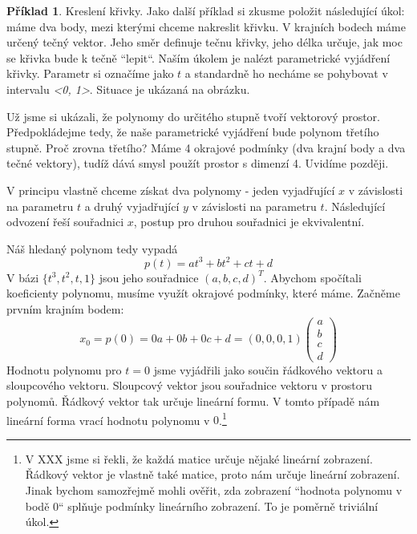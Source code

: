 \documentclass[a5paper,12pt]{amsbook}
\theoremstyle{definition}
\newtheorem{example}{Příklad}[chapter]
\begin{document}
\begin{example}\label{example:linforma2}Kreslení křivky. Jako další příklad si zkusme položit následující
úkol: máme dva body, mezi kterými chceme nakreslit křivku. V krajních bodech máme určený tečný vektor.
Jeho směr definuje tečnu křivky, jeho délka určuje, jak moc se křivka bude k tečně ``lepit``. Naším úkolem
je nalézt parametrické vyjádření křivky. Parametr si označíme jako $t$ a standardně ho necháme se pohybovat
v intervalu \textit{<0, 1>}. Situace je ukázaná na obrázku.

\begin{center}

\end{center}

Už jsme si ukázali, že polynomy do určitého stupně tvoří vektorový prostor. Předpokládejme tedy, že
naše parametrické vyjádření bude polynom třetího stupně. Proč zrovna třetího? Máme 4 okrajové podmínky
(dva krajní body a dva tečné vektory), tudíž dává smysl použít prostor s dimenzí 4. Uvidíme později.

V principu vlastně chceme získat dva polynomy - jeden vyjadřující $x$ v závislosti na parametru $t$
a druhý vyjadřující $y$ v závislosti na parametru $t$. Následující odvození řeší souřadnici $x$, postup
pro druhou souřadnici je ekvivalentní.

Náš hledaný polynom tedy vypadá 
\begin{equation*}
p(t)=at^3 + bt^2 + ct + d
\end{equation*}
V bázi $\{t^3, t^2, t, 1\}$ jsou jeho souřadnice $(a, b, c, d)^T$. Abychom spočítali koeficienty
polynomu, musíme využít okrajové podmínky, které máme. Začněme prvním krajním bodem:
\begin{equation*}
x_0 = p(0) = 0a + 0b + 0c + d = \left(0, 0, 0, 1\right)\left(\begin{array}{c}
a\\
b\\
c\\
d
\end{array}\right)
\end{equation*}
Hodnotu polynomu pro $t=0$ jsme vyjádřili jako součin řádkového vektoru a sloupcového vektoru. Sloupcový
vektor jsou souřadnice vektoru v prostoru polynomů. Řádkový vektor tak určuje lineární formu. V tomto
případě nám lineární forma vrací hodnotu polynomu v $0$.\footnote{
  V XXX jsme si řekli, že každá matice určuje nějaké lineární zobrazení. Řádkový vektor je vlastně také
  matice, proto nám určuje lineární zobrazení. Jinak bychom samozřejmě mohli ověřit, zda zobrazení
  ``hodnota polynomu v bodě 0`` splňuje podmínky lineárního zobrazení. To je poměrně triviální úkol.
}


\end{example}
\end{document}
